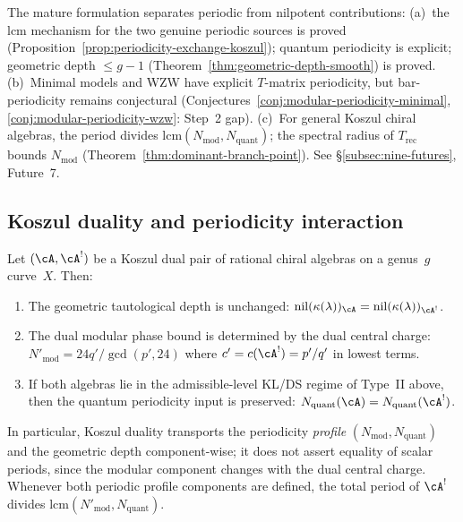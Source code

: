\begin{remark}\label{rem:stratified-periodicity}
The mature formulation separates periodic from nilpotent contributions:
(a)~the lcm mechanism for the two genuine periodic sources is proved
(Proposition~\ref{prop:periodicity-exchange-koszul}); quantum
periodicity is explicit; geometric depth $\leq g-1$
(Theorem~\ref{thm:geometric-depth-smooth}) is proved.
(b)~Minimal models and WZW have explicit $T$-matrix periodicity,
but bar-periodicity remains conjectural
(Conjectures~\ref{conj:modular-periodicity-minimal},
\ref{conj:modular-periodicity-wzw}: Step~2 gap).
(c)~For general Koszul chiral algebras, the period divides
$\mathrm{lcm}(N_{\mathrm{mod}}, N_{\mathrm{quant}})$; the spectral
radius of $T_{\mathrm{rec}}$ bounds $N_{\mathrm{mod}}$
(Theorem~\ref{thm:dominant-branch-point}).
See \S\ref{subsec:nine-futures}, Future~7.
\end{remark}

\subsection{Koszul duality and periodicity interaction}

\begin{proposition}
\label{prop:periodicity-exchange-koszul}
Let $(\cA, \cA^!)$ be a Koszul dual pair of rational chiral algebras on a genus~$g$ curve~$X$. Then:
\begin{enumerate}
\item The geometric tautological depth is unchanged:
  $\mathrm{nil}(\kappa(\lambda))_{\cA} =
  \mathrm{nil}(\kappa(\lambda))_{\cA^!}$.
\item The dual modular phase bound is determined by the dual central
  charge: $N'_{\text{mod}} = 24q'/\gcd(p', 24)$ where
  $c' = c(\cA^!) = p'/q'$ in lowest terms.
\item If both algebras lie in the admissible-level KL/DS regime of
  Type~II above, then the quantum periodicity input is preserved:
  $N_{\text{quant}}(\cA) = N_{\text{quant}}(\cA^!)$.
\end{enumerate}
In particular, Koszul duality transports the periodicity \emph{profile}
$(N_{\text{mod}}, N_{\text{quant}})$ and the geometric depth
component-wise; it
does not assert equality of scalar periods, since the modular component
changes with the dual central charge.  Whenever both periodic profile
components are defined, the total period of $\cA^!$ divides
$\mathrm{lcm}(N'_{\text{mod}}, N_{\text{quant}})$.
\end{proposition}

